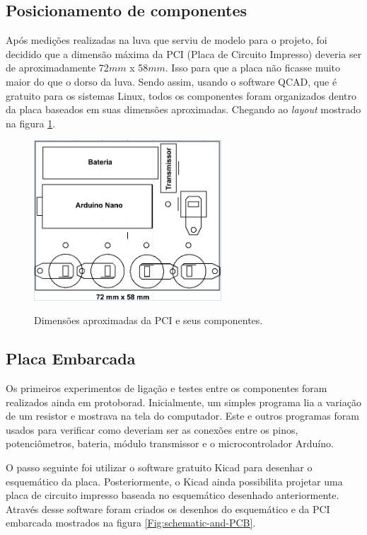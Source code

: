 \documentclass[
	12pt,				%
	openright,			%
	oneside,			%
	a4paper,			%
	english,			%
	brazil				%
	]{abntex2}
\begin{document}
			\subsection{Posicionamento de componentes}

			Após medições realizadas na luva que serviu de modelo para o projeto, foi decidido que a dimensão máxima da PCI (Placa de Circuito Impresso) deveria ser de aproximadamente 72$mm$ x 58$mm$. Isso para que a placa não ficasse muito maior do que o dorso da luva. Sendo assim, usando o software QCAD, que é gratuito para os sistemas Linux, todos os componentes foram organizados dentro da placa baseados em suas dimensões aproximadas. Chegando ao \textit{layout} mostrado na figura \ref{Fig:size-glove-module1}.

		\begin{figure}[h!]
			\centering
			\caption{Dimensões aproximadas da PCI e seus componentes.}
  		\includegraphics[width=7cm]{figures/size-glove-module1.png}
  		\label{Fig:size-glove-module1}
		\end{figure}


			\subsection{Placa Embarcada}

			Os primeiros experimentos de ligação e testes entre os componentes foram realizados ainda em protoborad. Inicialmente, um simples programa lia a variação de um resistor e mostrava na tela do computador. Este e outros programas foram usados para verificar como deveriam ser as conexões entre os pinos, potenciômetros, bateria, módulo transmissor e o microcontrolador Arduíno.

			O passo seguinte foi utilizar o software gratuito Kicad para desenhar o esquemático da placa. Posteriormente, o Kicad ainda possibilita projetar uma placa de circuito impresso baseada no esquemático desenhado anteriormente. Através desse software foram criados os desenhos do esquemático e da PCI embarcada mostrados na figura \ref{Fig:schematic-and-PCB}.
\end{document}

